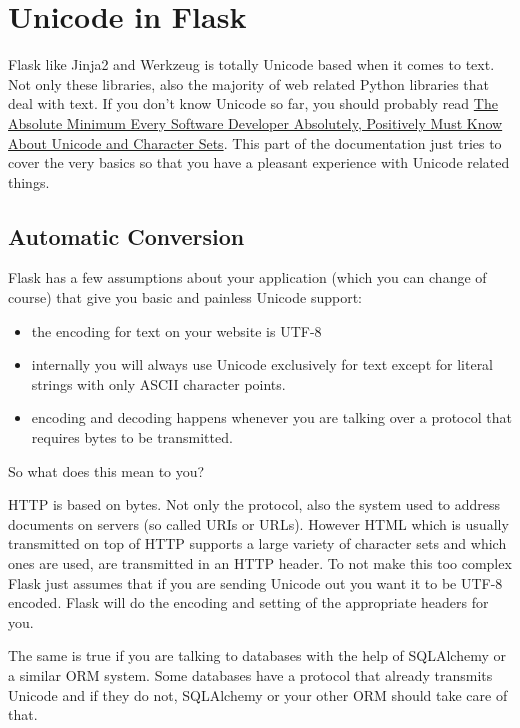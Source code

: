 \documentclass[a4paper,12pt]{sphinxmanual}
\begin{document}
\chapter{Unicode in Flask}
\label{unicode::doc}\label{unicode:unicode-in-flask}
Flask like Jinja2 and Werkzeug is totally Unicode based when it comes to
text.  Not only these libraries, also the majority of web related Python
libraries that deal with text.  If you don't know Unicode so far, you
should probably read \href{http://www.joelonsoftware.com/articles/Unicode.html}{The Absolute Minimum Every Software Developer
Absolutely, Positively Must Know About Unicode and Character Sets}.  This part of the
documentation just tries to cover the very basics so that you have a
pleasant experience with Unicode related things.


\section{Automatic Conversion}
\label{unicode:automatic-conversion}
Flask has a few assumptions about your application (which you can change
of course) that give you basic and painless Unicode support:
\begin{itemize}
\item {} 
the encoding for text on your website is UTF-8

\item {} 
internally you will always use Unicode exclusively for text except
for literal strings with only ASCII character points.

\item {} 
encoding and decoding happens whenever you are talking over a protocol
that requires bytes to be transmitted.

\end{itemize}

So what does this mean to you?

HTTP is based on bytes.  Not only the protocol, also the system used to
address documents on servers (so called URIs or URLs).  However HTML which
is usually transmitted on top of HTTP supports a large variety of
character sets and which ones are used, are transmitted in an HTTP header.
To not make this too complex Flask just assumes that if you are sending
Unicode out you want it to be UTF-8 encoded.  Flask will do the encoding
and setting of the appropriate headers for you.

The same is true if you are talking to databases with the help of
SQLAlchemy or a similar ORM system.  Some databases have a protocol that
already transmits Unicode and if they do not, SQLAlchemy or your other ORM
should take care of that.
\end{document}

